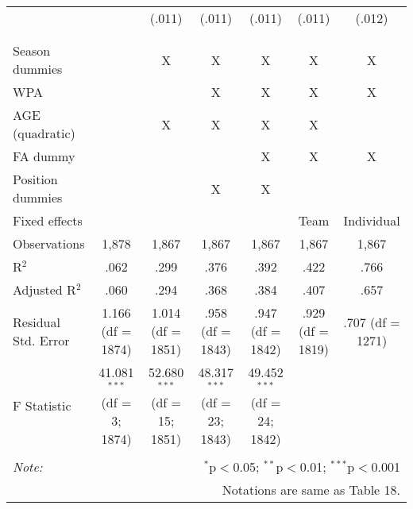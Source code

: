 \begin{table}[H]
\begin{tabular}{@{\extracolsep{5pt}}lcccccc}
  &  & (.011) & (.011) & (.011) & (.011) & (.012) \\
  & & & & & & \\
\hline \\[-1.8ex]
Season dummies &  & X & X & X & X & X \\
WPA & & & X & X & X & X \\
AGE (quadratic) &  & X & X & X & X &  \\
FA dummy &  &  &  & X & X & X \\
Position dummies &  &  & X & X &  &  \\
Fixed effects &  &  &  &  & Team & Individual \\
Observations & 1,878 & 1,867 & 1,867 & 1,867 & 1,867 & 1,867 \\
R$^{2}$ & .062 & .299 & .376 & .392 & .422 & .766 \\
Adjusted R$^{2}$ & .060 & .294 & .368 & .384 & .407 & .657 \\
Residual Std. Error & 1.166 (df = 1874) & 1.014 (df = 1851) & .958 (df = 1843) & .947 (df = 1842) & .929 (df = 1819) & .707 (df = 1271) \\
F Statistic & 41.081$^{***}$ (df = 3; 1874) & 52.680$^{***}$ (df = 15; 1851) & 48.317$^{***}$ (df = 23; 1843) & 49.452$^{***}$ (df = 24; 1842) &  &  \\
\hline
\hline \\[-1.8ex]
\textit{Note:}  & \multicolumn{6}{r}{$^{*}$p$<$0.05; $^{**}$p$<$0.01; $^{***}$p$<$0.001} \\
& \multicolumn{6}{r}{Notations are same as Table 18.} \\
\end{tabular}
\end{table}
